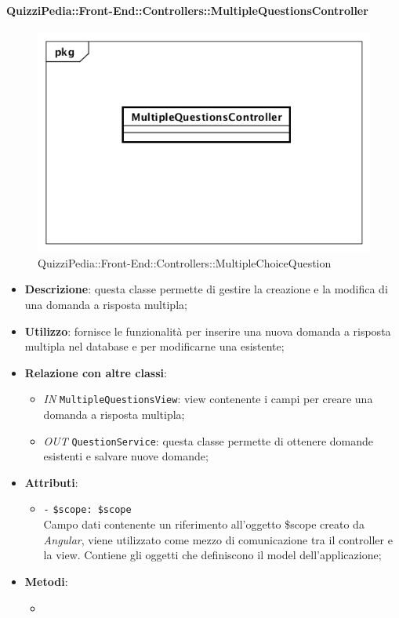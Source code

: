 \paragraph{QuizziPedia::Front-End::Controllers::MultipleQuestionsController}
\begin{figure} [ht]
	\centering
	\includegraphics[scale=0.45]{UML/Classi/Front-End/QuizziPedia_Front-end_Controller_MultipleQuestionsController.png}
	\caption{QuizziPedia::Front-End::Controllers::MultipleChoiceQuestion}
\end{figure} \FloatBarrier
\begin{itemize}
	\item \textbf{Descrizione}: questa classe permette di gestire la creazione e la modifica di una domanda a risposta multipla;
	\item \textbf{Utilizzo}: fornisce le funzionalità per inserire una nuova domanda a risposta multipla nel database e per modificarne una esistente;
	\item \textbf{Relazione con altre classi}:
	\begin{itemize}
		\item \textit{IN} \texttt{MultipleQuestionsView}: view contenente i campi per creare una domanda a risposta multipla;  
		\item \textit{OUT} \texttt{QuestionService}: questa classe permette di ottenere domande esistenti e salvare nuove domande;
	\end{itemize}
	\item \textbf{Attributi}:
	\begin{itemize}
		\item \texttt{-} \texttt{\$scope: \$scope} \\
		Campo dati contenente un riferimento all’oggetto \$scope creato da \textit{Angular}, viene utilizzato come mezzo di comunicazione tra il controller e la view. Contiene gli oggetti che definiscono il model dell’applicazione;
	\end{itemize}
	\item \textbf{Metodi}:
	\begin{itemize}
		\item 
	\end{itemize}
\end{itemize}

